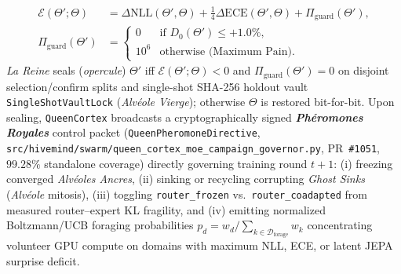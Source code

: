 \documentclass[11pt,a4paper]{article}
\begin{document}
\begin{enumerate}[leftmargin=1.8em]
    \begin{align}
        \mathcal{E}(\Theta'; \Theta) &= \Delta\mathrm{NLL}(\Theta', \Theta) + \tfrac{1}{4}\Delta\mathrm{ECE}(\Theta', \Theta) + \Pi_{\mathrm{guard}}(\Theta'), \label{eq:v440_anse} \\
        \Pi_{\mathrm{guard}}(\Theta') &= \begin{cases} 0 & \text{if } D_0(\Theta') \le +1.0\%, \\ 10^6 & \text{otherwise (Maximum Pain).} \end{cases} \nonumber
    \end{align}
    \emph{La Reine} seals (\emph{opercule}) $\Theta'$ iff $\mathcal{E}(\Theta';\Theta) < 0$ and $\Pi_{\mathrm{guard}}(\Theta') = 0$ on disjoint selection/confirm splits and single-shot SHA-256 holdout vault \texttt{SingleShotVaultLock} (\emph{Alv\'eole Vierge}); otherwise $\Theta$ is restored bit-for-bit. Upon sealing, \texttt{QueenCortex} broadcasts a cryptographically signed \textbf{\emph{Ph\'eromones Royales}} control packet (\texttt{QueenPheromoneDirective}, \texttt{src/hivemind/swarm/\allowbreak queen\_cortex\_moe\_\allowbreak campaign\_governor.py}, PR~\texttt{\#1051}, $99.28\%$ standalone coverage) directly governing training round $t+1$: (i) freezing converged \emph{Alv\'eoles Ancres}, (ii) sinking or recycling corrupting \emph{Ghost Sinks} (\emph{Alv\'eole} mitosis), (iii) toggling \texttt{router\_frozen} vs.\ \texttt{router\_coadapted} from measured router--expert KL fragility, and (iv) emitting normalized Boltzmann/UCB foraging probabilities $p_d = w_d / \sum_{k \in \mathcal{D}_{\mathrm{forage}}} w_k$ concentrating volunteer GPU compute on domains with maximum NLL, ECE, or latent JEPA surprise deficit.
\end{enumerate}
\end{document}
